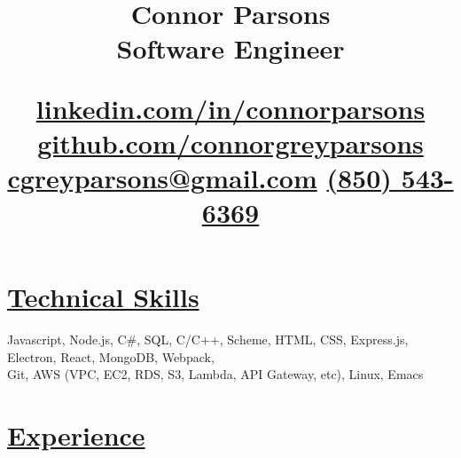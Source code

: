 \documentclass[11pt]{article}
\date{}
\title{\vspace{-4ex}\textbf{Connor Parsons}\\\medskip
\large Software Engineer\\\begin{normalsize}\href{https://linkedin.com/in/connorparsons}{linkedin.com/in/connorparsons} \textbullet{} \href{https://github.com/connorgreyparsons}{github.com/connorgreyparsons} \textbullet{} \href{mailto:cgreyparsons@gmail.com}{cgreyparsons@gmail.com} \textbullet{} \href{tel:8505436369}{(850) 543-6369}\vspace{-12ex}\end{normalsize}}
\begin{document}
\maketitle

\section*{\underline{Technical Skills}}
\label{sec:orgc14ae8e}
Javascript, Node.js, C\#, SQL, C/C++, Scheme, HTML, CSS, Express.js, Electron, React, MongoDB, Webpack,
\\Git, AWS (VPC, EC2, RDS, S3, Lambda, API Gateway, etc), Linux, Emacs

\section*{\underline{Experience}}
\label{sec:orga10dbe6}
\end{document}
